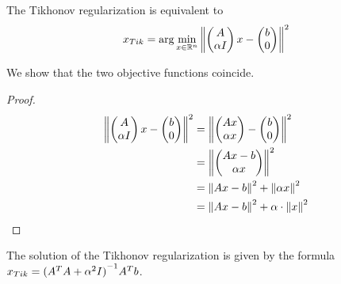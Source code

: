 \documentclass[computationalMathematics.tex]{subfiles}
\begin{document}
\begin{proposition}
The Tikhonov regularization is equivalent to 
\begin{equation} \label{eq:7novxtik}
  x_{Tik} = \arg \min_{x\in\mathbb{R}^n} {\left\lVert\begin{pmatrix}
    A\\
    \alpha I
\end{pmatrix} x - \begin{pmatrix}
    b\\0
\end{pmatrix}\right\rVert}^2
\end{equation}
\end{proposition}
We show that the two objective functions coincide.
\begin{proof}
  \begin{equation}
    \begin{aligned}
      {\left\lVert\begin{pmatrix}
        A\\
        \alpha I
      \end{pmatrix} x -
      \begin{pmatrix}
        b\\0
      \end{pmatrix}\right\rVert}^2 &= {\left\lVert\begin{pmatrix}
        Ax\\
        \alpha x
      \end{pmatrix} -
      \begin{pmatrix}
        b\\0
      \end{pmatrix}\right\rVert}^2\\
      &= {\left\lVert\begin{pmatrix}
        Ax - b\\
        \alpha x
      \end{pmatrix}\right\rVert}^2\\
      &= {\left\lVert Ax-b\right\rVert}^2 + {\left\lVert\alpha x\right\rVert}^2\\
      &= {\left\lVert Ax-b\right\rVert}^2 + \alpha \cdot {\left\lVert x\right\rVert}^2\\
    \end{aligned}
  \end{equation}
\end{proof}

\begin{proposition}
The solution of the Tikhonov regularization is given by the formula $x_{Tik}={({A}^{T}A + {\alpha}^{2} I)}^{-1}{A}^{T} b$.
\end{proposition}
\end{document}
